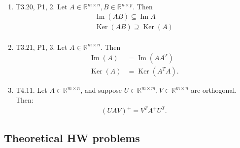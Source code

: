 \documentclass{article}
\newcommand{\RR}{\mathbb{R}}
\DeclareMathOperator{\Ker}{Ker}
\DeclareMathOperator{\Ima}{Im}
\DeclareMathOperator{\Ima}{Im}
\begin{document}
\begin{enumerate}
    \item T3.20, P1, 2. Let $A \in \RR^{m \times n}, B \in \RR^{n \times p}$.  Then
      \begin{align*}
        \Ima (AB) \subseteq \Ima A \\
        \Ker (AB) \supseteq \Ker (A) \\
      \end{align*}

    \item T3.21, P1, 3. Let $A \in \RR^{m \times n}$.  Then
      \begin{align*}
        \Ima (A) &= \Ima (A A^T) \\
        \Ker (A) &= \Ker (A^T A).
      \end{align*}

    \item T4.11. Let $A \in \RR^{m \times n}$, and suppose $U \in \RR^{m \times m}, V \in \RR^{m \times n}$ are orthogonal.  Then:
      \begin{align*}
        (U A V)^{+} = V^T A^{+} U^T.
      \end{align*}
\end{enumerate}

\subsection{Theoretical HW problems}
\end{document}
